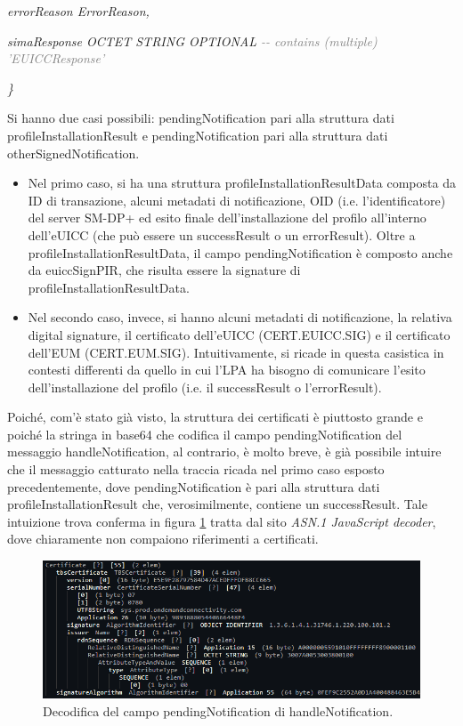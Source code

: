 \documentclass[10pt, oneside]{book}
\begin{document}
\hspace{0.75cm} \textit{errorReason ErrorReason,}

\hspace{0.75cm} \textit{simaResponse OCTET STRING OPTIONAL \textcolor{gray}{{-}{-} contains (multiple) 'EUICCResponse'}}

\textit{\}\\}

Si hanno due casi possibili: pendingNotification pari alla struttura dati profileInstallationResult e pendingNotification pari alla struttura dati otherSignedNotification.
\begin{itemize}
\item Nel primo caso, si ha una struttura profileInstallationResultData composta da ID di transazione, alcuni metadati di notificazione, OID (i.e. l'identificatore) del server SM-DP+ ed esito finale dell'installazione del profilo all'interno dell'eUICC (che può essere un successResult o un errorResult). Oltre a profileInstallationResultData, il campo pendingNotification è composto anche da euiccSignPIR, che risulta essere la signature di profileInstallationResultData.
\item Nel secondo caso, invece, si hanno alcuni metadati di notificazione, la relativa digital signature, il certificato dell'eUICC (CERT.EUICC.SIG) e il certificato dell'EUM (CERT.EUM.SIG). Intuitivamente, si ricade in questa casistica in contesti differenti da quello in cui l'LPA ha bisogno di comunicare l'esito dell'installazione del profilo (i.e. il successResult o l'errorResult).
\end{itemize}
Poiché, com'è stato già visto, la struttura dei certificati è piuttosto grande e poiché la stringa in base64 che codifica il campo pendingNotification del messaggio handleNotification, al contrario, è molto breve, è già possibile intuire che il messaggio catturato nella traccia ricada nel primo caso esposto precedentemente, dove pendingNotification è pari alla struttura dati profileInstallationResult che, verosimilmente, contiene un successResult. Tale intuizione trova conferma in figura \ref{fig:decode-pendingNotification} tratta dal sito \textit{ASN.1 JavaScript decoder}, dove chiaramente non compaiono riferimenti a certificati.
\begin{figure}
\includegraphics[width=\linewidth]{decode-pendingNotification.png}
\caption{Decodifica del campo pendingNotification di handleNotification.}
\label{fig:decode-pendingNotification}
\end{figure}
\end{document}
